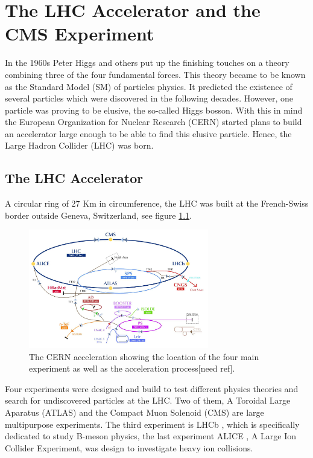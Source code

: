 
\chapter{The LHC Accelerator and the CMS Experiment}\label{ch:lhcandcms}
In the 1960s Peter Higgs and others {\color{red}} put up the finishing touches on a theory combining three of the four fundamental forces. This theory became to be known as the Standard Model (SM) of particles physics. It predicted the existence of several particles which were discovered in the following decades. However, one particle was proving to be elusive, the so-called Higgs bosson. With this in mind the European Organization for Nuclear Research (CERN) started plans to build an accelerator large enough to be able to find this elusive particle. Hence, the Large Hadron Collider (LHC) was born. 

\section{The LHC Accelerator}
A circular ring of 27 Km in circumference, the LHC was built at the French-Swiss border outside Geneva, Switzerland, see figure \ref{fig:cern}. 

\begin{figure}[!h]
  \centering
  \includegraphics[width=0.7\textwidth]{../images/ch2/cern_complex}
  \caption[The CERN acceleration ]{The CERN acceleration  showing the location of the four main experiment as well as the acceleration process[need ref].}\label{fig:cern}
\end{figure}




Four experiments were designed and build to test different physics theories and search for undiscovered particles at the LHC. Two of them, A Toroidal Large Aparatus (ATLAS)\cite{atlas} and the Compact Muon Solenoid (CMS)\cite{cms_doc} are large multipurpose experiments. The third experiment is LHCb \cite{lhcb}, which is specifically dedicated to study B-meson physics, the last experiment ALICE \cite{alice}, A Large Ion Collider Experiment, was design to investigate heavy ion collisions.



